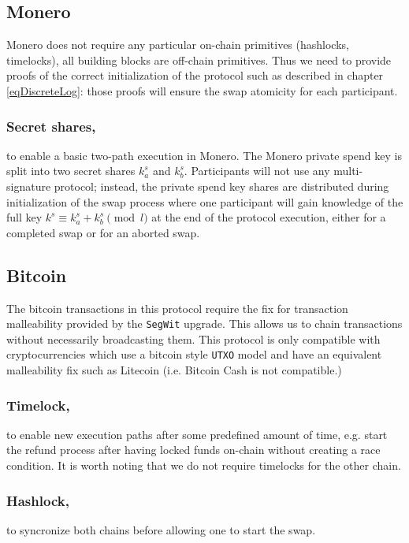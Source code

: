 \documentclass{llncs}
\begin{document}
\subsection{Monero}
Monero does not require any particular on-chain primitives (hashlocks, timelocks), all building blocks are off-chain primitives. Thus we need to provide proofs of the correct initialization of the protocol such as described in chapter \ref{eqDiscreteLog}: those proofs will ensure the swap atomicity for each participant.

\subsubsection{Secret shares,}
to enable a basic two-path execution in Monero. The Monero private spend key is split into two secret shares $k^s_a$ and $k^s_b$. Participants will not use any multi-signature protocol; instead, the private spend key shares are distributed during initialization of the swap process where one participant will gain knowledge of the full key $k^s \equiv k^s_a + k^s_b \pmod l$ at the end of the protocol execution, either for a completed swap or for an aborted swap.

\subsection{Bitcoin}
\label{bitcoinPrerequisites}
The bitcoin transactions in this protocol require the fix for transaction malleability provided by the \texttt{SegWit} upgrade.  This allows us to chain transactions without necessarily broadcasting them. This protocol is only compatible with cryptocurrencies which use a bitcoin style \texttt{UTXO} model and have an equivalent malleability fix such as Litecoin (i.e. Bitcoin Cash is not compatible.)

\subsubsection{Timelock,}
to enable new execution paths after some predefined amount of time, e.g. start the refund process after having locked funds on-chain without creating a race condition. It is worth noting that we do not require timelocks for the other chain.

\subsubsection{Hashlock,}
to syncronize both chains before allowing one to start the swap.
\end{document}
